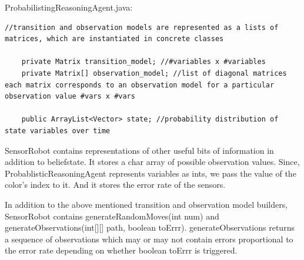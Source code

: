 \documentclass[a4paper]{article}
\begin{document}
ProbabilistingReasoningAgent.java:
\begin{lstlisting}
//transition and observation models are represented as a lists of matrices, which are instantiated in concrete classes
	
	private Matrix transition_model; //#variables x #variables
	private Matrix[] observation_model; //list of diagonal matrices each matrix corresponds to an observation model for a particular observation value #vars x #vars

	public ArrayList<Vector> state; //probability distribution of state variables over time
\end{lstlisting}

SensorRobot contains representations of other useful bits of information in addition to beliefstate. It stores a char array of possible observation values. Since, ProbablisticReasoningAgent represents variables as ints, we pass the value of the color's index to it. And it stores the error rate of the sensors.

In addition to the above mentioned transition and observation model builders, SensorRobot contains generateRandomMoves(int num) and generateObservations(int[][] path, boolean toErrr). generateObservations returns a sequence of observations which may or may not contain errors proportional to the error rate depending on whether boolean toErrr is triggered.
\end{document}
